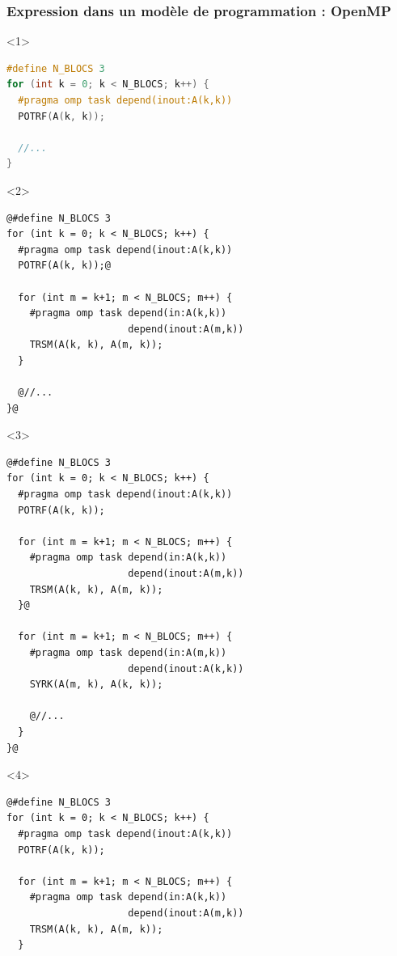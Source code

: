 \documentclass[xcolor={usenames,dvipsnames,svgnames,table}, aspectratio=43]{beamer}
\begin{document}
\begin{frame}[fragile]
\frametitle{Expression dans un modèle de programmation : OpenMP}

\begin{minipage}[t]{0.52\linewidth}
  \vspace{0.3cm}
  \begin{onlyenv}<1>
  \begin{lstlisting}[language=c]
#define N_BLOCS 3
for (int k = 0; k < N_BLOCS; k++) {
  #pragma omp task depend(inout:A(k,k))
  POTRF(A(k, k));

  //...
}
  \end{lstlisting}
\end{onlyenv}
  \begin{onlyenv}<2>
  \begin{lstlisting}[style=transparency]
@#define N_BLOCS 3
for (int k = 0; k < N_BLOCS; k++) {
  #pragma omp task depend(inout:A(k,k))
  POTRF(A(k, k));@

  for (int m = k+1; m < N_BLOCS; m++) {
    #pragma omp task depend(in:A(k,k))
                     depend(inout:A(m,k))
    TRSM(A(k, k), A(m, k));
  }

  @//...
}@
  \end{lstlisting}
\end{onlyenv}
  \begin{onlyenv}<3>
  \begin{lstlisting}[style=transparency]
@#define N_BLOCS 3
for (int k = 0; k < N_BLOCS; k++) {
  #pragma omp task depend(inout:A(k,k))
  POTRF(A(k, k));

  for (int m = k+1; m < N_BLOCS; m++) {
    #pragma omp task depend(in:A(k,k))
                     depend(inout:A(m,k))
    TRSM(A(k, k), A(m, k));
  }@

  for (int m = k+1; m < N_BLOCS; m++) {
    #pragma omp task depend(in:A(m,k))
                     depend(inout:A(k,k))
    SYRK(A(m, k), A(k, k));

    @//...
  }
}@
  \end{lstlisting}
\end{onlyenv}
  \begin{onlyenv}<4>
  \begin{lstlisting}[style=transparency]
@#define N_BLOCS 3
for (int k = 0; k < N_BLOCS; k++) {
  #pragma omp task depend(inout:A(k,k))
  POTRF(A(k, k));

  for (int m = k+1; m < N_BLOCS; m++) {
    #pragma omp task depend(in:A(k,k))
                     depend(inout:A(m,k))
    TRSM(A(k, k), A(m, k));
  }


\end{lstlisting}
\end{onlyenv}
\end{minipage}
\end{frame}
\end{document}

